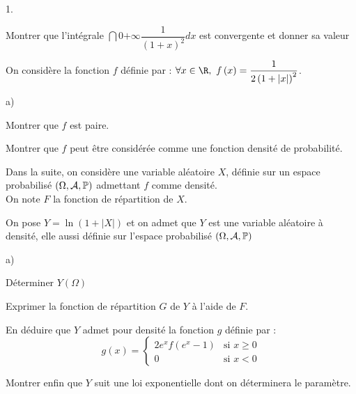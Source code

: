 \documentclass[11pt]{article}%
\begin{document}
\begin{noliste}{1.}
 \setlength{\itemsep}{4mm}
\item Montrer que l'intégrale $\dint{0}{+ \infty }\dfrac{1}{\left(
1 + x\right) ^{2}}dx$ est convergente et donner sa valeur

\item On considère la fonction $f$ définie par : $\forall x\in
\R,\ f\left( x\right) = \dfrac{1}{2\left( 1 + \left| x\right|
\right) ^{2}}$.

\begin{noliste}{a)}
 \setlength{\itemsep}{2mm}
\item Montrer que $f$ est paire.

\item Montrer que $f$ peut être considérée comme une fonction
densité de probabilité.
\end{noliste}

\hspace{-1cm}Dans la suite, on considère une variable aléatoire $X$,
définie sur un espace probabilisé $\left(
\Omega,\mathcal{A},\mathbb{P}\right) $ admettant $f$ comme densité.\\
\hspace{-1cm}On note $F$ la fonction de répartition de $X$.

\item On pose $Y = \ln \left( 1 + \left| X\right| \right) $ et on
admet que $Y$ est une variable aléatoire à densité, elle aussi définie
sur l'espace probabilisé $\left( \Omega,\mathcal{A},\mathbb{P}\right) $

\begin{noliste}{a)}
 \setlength{\itemsep}{2mm}
\item Déterminer $Y\left( \Omega \right) $

\item Exprimer la fonction de répartition $G$ de $Y$ à l'aide de $F.$

\item En déduire que $Y$ admet pour densité la fonction $g$ définie par
:
\[
g\left( x\right) = \left\{
\begin{array}{cc}
2e^{x}f\left( e^{x}-1\right) & \text{si }x\geq 0 \\
0 & \text{si }x<0
\end{array}
\right.
\]

\item Montrer enfin que $Y$ suit une loi exponentielle dont on
déterminera le paramètre.
\end{noliste}
\end{noliste}
\end{document}
